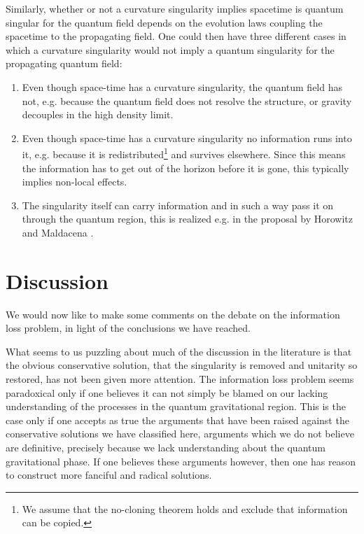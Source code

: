 \documentclass[12pt]{article}
\begin{document}
Similarly, whether or not a curvature singularity implies spacetime is quantum singular for the quantum field 
depends on the evolution laws coupling the spacetime to the propagating field. One could then have three 
different cases in which a curvature singularity would not imply a quantum singularity for the propagating quantum field:

\begin{enumerate}
\item Even though space-time has a curvature singularity, the quantum field has not, e.g. because the quantum
field does not resolve the structure, or gravity decouples in the high density limit.
\item Even though space-time has a curvature singularity no information runs into it, e.g. because it 
is redistributed\footnote{We assume that the no-cloning theorem holds and exclude that information can be copied.} 
and survives elsewhere. Since this means the information has to get out of the horizon before it
is gone, this typically implies non-local effects. 

\item The singularity itself can carry information and in such a way pass it on through the quantum region, this is 
realized
e.g. in the proposal by Horowitz and Maldacena \cite{Horowitz:2003he}. 
\end{enumerate}

\section{Discussion}
\label{discussion}

We would now like to make some comments on the debate on the information loss problem, in light of the conclusions we have reached.

What seems to us puzzling about much of the discussion in the literature is that the obvious conservative solution, that 
the singularity is removed and unitarity so restored, has not been given more attention. The information loss problem seems
paradoxical only if one believes it can not simply be blamed on our lacking understanding of the processes in the
quantum gravitational region. This is the case only if one accepts as true the arguments that have
been raised against the conservative solutions we have classified here, arguments which we do not believe are
definitive, precisely because we lack understanding about the quantum gravitational phase. If one believes these arguments 
however, then one has reason to construct more fanciful and radical solutions. 
\end{document}
